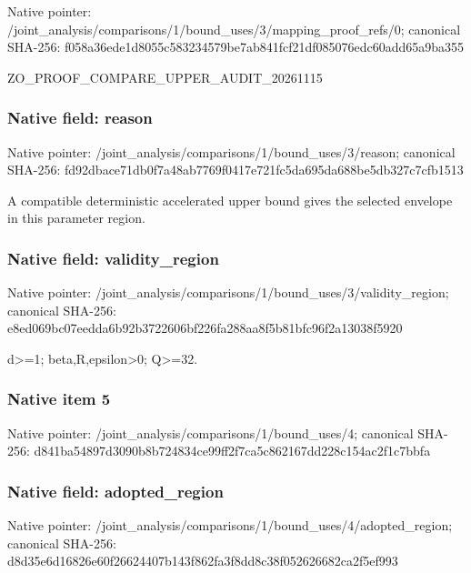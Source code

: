 \documentclass[10pt,a4paper]{article}
\begin{document}
Native pointer: /joint\_analysis/comparis\allowbreak{}ons/1/bound\_uses/3/mappi\allowbreak{}ng\_proof\_refs/0; canonical SHA-256: f058a36ede1d8055c5832345\allowbreak{}79be7ab841fcf21df085076e\allowbreak{}dc60add65a9ba355


ZO\_PROOF\_COMPARE\_UPPER\_AUDIT\_20261115


\subsubsection{Native field: reason}


Native pointer: /joint\_analysis/comparis\allowbreak{}ons/1/bound\_uses/3/reaso\allowbreak{}n; canonical SHA-256: fd92dbace71db0f7a48ab776\allowbreak{}9f0417e721fc5da695da688b\allowbreak{}e5db327c7cfb1513


A compatible deterministic accelerated upper bound gives the selected envelope in this parameter region.


\subsubsection{Native field: validity\_region}


Native pointer: /joint\_analysis/comparis\allowbreak{}ons/1/bound\_uses/3/valid\allowbreak{}ity\_region; canonical SHA-256: e8ed069bc07eedda6b92b372\allowbreak{}2606bf226fa288aa8f5b81bf\allowbreak{}c96f2a13038f5920


d>=1; beta,R,epsilon>0; Q>=32.


\subsubsection{Native item 5}


Native pointer: /joint\_analysis/comparis\allowbreak{}ons/1/bound\_uses/4; canonical SHA-256: d841ba54897d3090b8b72483\allowbreak{}4ce99ff2f7ca5c862167dd22\allowbreak{}8c154ac2f1c7bbfa



\subsubsection{Native field: adopted\_region}


Native pointer: /joint\_analysis/comparis\allowbreak{}ons/1/bound\_uses/4/adopt\allowbreak{}ed\_region; canonical SHA-256: d8d35e6d16826e60f2662440\allowbreak{}7b143f862fa3f8dd8c38f052\allowbreak{}626682ca2f5ef993
\end{document}
